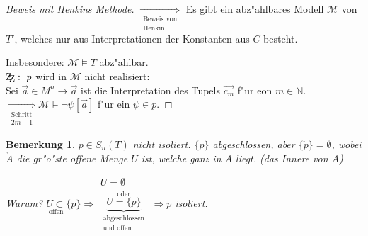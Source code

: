 \documentclass[a4paper,12pt,numbers=noenddot,parskip=full]{scrartcl}
\newcommand{\setN}{\mathbb{N}}
\newcommand{\zz}{\mathrm{Z\kern-.3em\raise-0.5ex\hbox{Z}}:~}
\theoremstyle{dotless}
\newtheorem{remark}[theorem]{Bemerkung}
\begin{document}
\begin{proof}[Beweis mit Henkins Methode]
	$\underset{\substack{\text{Beweis von}\\\text{Henkin}}}{\Longrightarrow}$ Es gibt ein abz"ahlbares Modell $\mathcal{M}$ von $T'$, welches nur aus Interpretationen der Konstanten aus $C$ besteht.
	
	\underline{Insbesondere:} $\mathcal{M} \models T$ abz"ahlbar.\\
	$\zz p$ wird in $\mathcal{M}$ nicht realisiert:\\
	Sei $\vec{a} \in M^n \rightarrow \vec{a}$ ist die Interpretation des Tupels $\vec{c_m}$ f"ur eon $m \in \setN$.\\
	$\underset{\substack{\text{Schritt}\\ 2m+1}}{\Longrightarrow} \mathcal{M} \models \lnot \psi[\vec{a}]$ f"ur ein $\psi \in p$.
\end{proof}

\begin{remark}
	$p \in S_n (T)$ nicht isoliert. $\{p\}$ abgeschlossen, aber $\{\mathring{p} \} = \emptyset$, wobei $\mathring{A}$ die gr"o"ste offene Menge $U$ ist, welche ganz in $A$ liegt. (das Innere von $A$)
	
	\emph{Warum?} $\underset{\text{offen}}{U \subset} \{p\} \Longrightarrow \begin{array}{c}
		U = \emptyset\\
		\overset{\text{oder}}{\underbrace{U = \{p\}}_{\substack{\text{abgeschlossen}\\\text{und offen}}}} 
	\end{array}\Longrightarrow p$ isoliert.
\end{remark}
\end{document}
